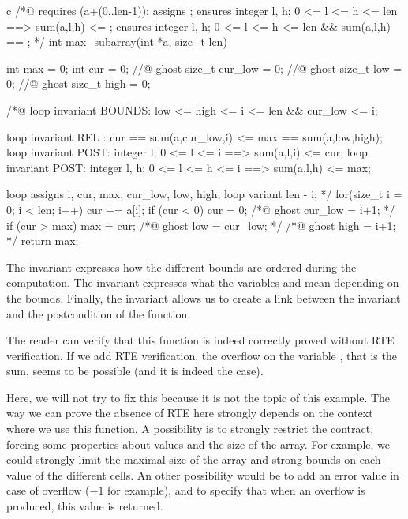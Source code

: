 \begin{CodeBlock}{c}
/*@ 
  requires \valid(a+(0..len-1));
  assigns \nothing;
  ensures \forall integer l, h;  0 <= l <= h <= len ==> sum(a,l,h) <= \result;
  ensures \exists integer l, h;  0 <= l <= h <= len &&  sum(a,l,h) == \result;
*/
int max_subarray(int *a, size_t len) {
  int max = 0;
  int cur = 0;
  //@ ghost size_t cur_low = 0; 
  //@ ghost size_t low = 0;
  //@ ghost size_t high = 0; 

  /*@ 
    loop invariant BOUNDS: low <= high <= i <= len && cur_low <= i;
    
    loop invariant REL :   cur == sum(a,cur_low,i) <= max == sum(a,low,high);
    loop invariant POST:   \forall integer l;    0 <= l <= i      ==> sum(a,l,i) <= cur;
    loop invariant POST:   \forall integer l, h; 0 <= l <= h <= i ==> sum(a,l,h) <= max;
   
    loop assigns i, cur, max, cur_low, low, high;
    loop variant len - i; 
  */
  for(size_t i = 0; i < len; i++) {
    cur += a[i];
    if (cur < 0) {
      cur = 0;
      /*@ ghost cur_low = i+1; */
    }
    if (cur > max) {
      max = cur;
      /*@ ghost low = cur_low; */
      /*@ ghost high = i+1; */
    }
  }
  return max;
}
\end{CodeBlock}



The invariant  expresses how the different bounds are
ordered during the computation. The invariant  expresses
what the variables  and  mean depending on the
bounds. Finally, the invariant  allows us to create a link
between the invariant and the postcondition of the function.



The reader can verify that this function is indeed correctly proved
without RTE verification. If we add RTE verification, the overflow on
the variable , that is the sum, seems to be possible (and it
is indeed the case).




Here, we will not try to fix this because it is not the topic of this
example. The way we can prove the absence of RTE here strongly depends
on the context where we use this function. A possibility is to strongly
restrict the contract, forcing some properties about values and the size
of the array. For example, we could strongly limit the maximal size of
the array and strong bounds on each value of the different cells. An
other possibility would be to add an error value in case of overflow
(\(-1\) for example), and to specify that when an overflow is produced,
this value is returned.
